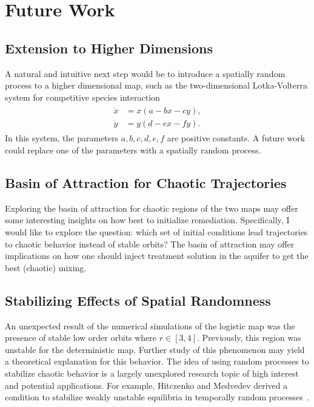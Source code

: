 \chapter{Future Work}
\section{Extension to Higher Dimensions}
A natural and intuitive next step would be to introduce a spatially
random process to a higher dimensional map, such as the
two-dimensional Lotka-Volterra
system for competitive species interaction
\begin{align}
\begin{split}
\dot{x} &= x(a-bx-cy),\\
\dot{y} &= y(d-ex-fy).
\end{split}
\end{align}
In this system, the parameters $a,b,c,d,e,f$ are positive constants. A
future work could replace one of the parameters with a spatially
random process. 
\section{Basin of Attraction for Chaotic Trajectories}
Exploring the basin of attraction for chaotic
regions of the two maps may offer some interesting insights on how
best to initialize remediation. Specifically, I would like to explore the
question: which set of initial conditions lead trajectories to chaotic
behavior instead of stable orbits? The basin of attraction may offer
implications on how one should inject treatment solution in the
aquifer to get the best (chaotic) mixing.
\section{Stabilizing Effects of Spatial Randomness}
An unexpected result of the numerical simulations of the logistic map
was the presence of stable low order orbits where $r \in
[3,4]$. Previously, this region was unstable for the deterministic
map. Further study of this phenomenon may yield a theoretical
explanation for this behavior. The idea of using random processes to
stabilize chaotic behavior is a largely unexplored research topic of
high interest and potential applications. For example, Hitczenko and Medvedev derived a condition to stabilize weakly
unstable equilibria in temporally random processes~\cite{hitczenko}.

